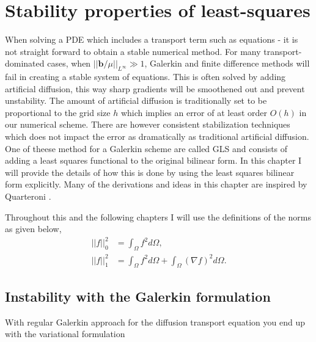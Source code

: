 
\chapter{Stability properties of least-squares} %

\label{chap:newTheory} %


When solving a PDE which includes a transport term such as equations - it is not straight forward to obtain a stable numerical method. For many transport-dominated cases, when $||\mathbf{b}/\mu||_{L^{\infty}} \gg 1$, Galerkin and finite difference methods will fail in creating a stable system of equations. This is often solved by adding artificial diffusion, this way sharp gradients will be smoothened out and prevent unstability. The amount of artificial diffusion is traditionally set to be proportional to the grid size $h$ which implies an error of at least order $O(h)$ in our numerical scheme. There are however consistent stabilization techniques which does not impact the error as dramatically as traditional artificial diffusion. One of theese method for a Galerkin scheme are called GLS and consists of adding a least squares functional to the original bilinear form. In this chapter I will provide the details of how this is done by using the least squares bilinear form explicitly. Many of the derivations and ideas in this chapter are inspired by Quarteroni \cite{Quarteroni}. 

Throughout this and the following chapters I will use the definitions of the norms as given below,
\begin{align}
	|| f||_0^2 &= \int_{\Omega}f^2d\Omega,\\
	|| f||_1^2 &= \int_{\Omega} f^2 d\Omega + \int_{\Omega}(\nabla f)^2 d\Omega.
	\label{eq:norms}
\end{align}

\section{Instability with the Galerkin formulation}

With regular Galerkin approach for the diffusion transport equation you end up with the variational formulation

